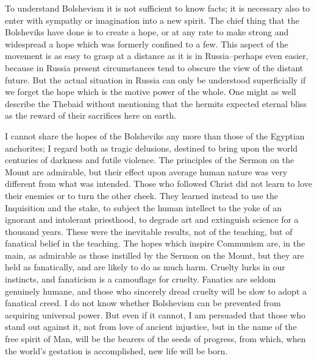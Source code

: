 To understand Bolshevism it is not sufficient to know facts; it is necessary also to enter with sympathy or imagination into a new spirit. The chief thing that the Bolsheviks have done is to create a hope, or at any rate to make strong and widespread a hope which was formerly confined to a few. This aspect of the movement is as easy to grasp at a distance as it is in Russia--perhaps even easier, because in Russia present circumstances tend to obscure the view of the distant future. But the actual situation in Russia can only be understood superficially if we forget the hope which is the motive power of the whole. One might as well describe the Thebaid without mentioning that the hermits expected eternal bliss as the reward of their sacrifices here on earth.

I cannot share the hopes of the Bolsheviks any more than those of the Egyptian anchorites; I regard both as tragic delusions, destined to bring upon the world centuries of darkness and futile violence. The principles of the Sermon on the Mount are admirable, but their effect upon average human nature was very different from what was intended. Those who followed Christ did not learn to love their enemies or to turn the other cheek. They learned instead to use the Inquisition and the stake, to subject the human intellect to the yoke of an ignorant and intolerant priesthood, to degrade art and extinguish science for a thousand years. These were the inevitable results, not of the teaching, but of fanatical belief in the teaching. The hopes which inspire Communism are, in the main, as admirable as those instilled by the Sermon on the Mount, but they are held as fanatically, and are likely to do as much harm. Cruelty lurks in our instincts, and fanaticism is a camouflage for cruelty. Fanatics are seldom genuinely humane, and those who sincerely dread cruelty will be slow to adopt a fanatical creed. I do not know whether Bolshevism can be prevented from acquiring universal power. But even if it cannot, I am persuaded that those who stand out against it, not from love of ancient injustice, but in the name of the free spirit of Man, will be the bearers of the seeds of progress, from which, when the world's gestation is accomplished, new life will be born.

